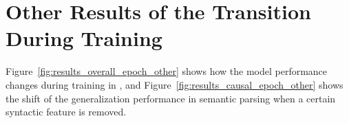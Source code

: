 

\section{Other Results of the Transition During Training}
\label{sec:causal_other}
Figure~\ref{fig:results_overall_epoch_other} shows how the model performance changes during training in \dobjppsubjpp{}, and 
Figure~\ref{fig:results_causal_epoch_other} shows the shift of the generalization performance in semantic parsing when a certain syntactic feature is removed.

